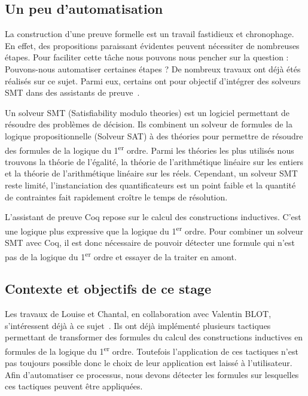 \documentclass[titlepage]{article}
\begin{document}
\subsection{Un peu d'automatisation}
La construction d'une preuve formelle est un travail fastidieux et chronophage. En effet, des propositions paraissant évidentes peuvent nécessiter de nombreuses étapes.
Pour faciliter cette tâche nous pouvons nous pencher sur la question : Pouvons-nous automatiser certaines étapes ? De nombreux travaux ont déjà étés réalisés sur ce sujet. Parmi eux, certains ont pour objectif d'intégrer des solveurs SMT dans des assistants de preuve~\cite{DBLP:conf/cpp/ArmandFGKTW11}.

Un solveur SMT (Satisfiability modulo theories) est un logiciel permettant de résoudre des problèmes de décision. Ils combinent un solveur de formules de la logique propositionnelle (Solveur SAT) à des théories pour permettre de résoudre des formules de la logique du 1\textsuperscript{er} ordre. Parmi les théories les plus utilisés nous trouvons la théorie de l'égalité, la théorie de l'arithmétique linéaire sur les entiers et la théorie de l'arithmétique linéaire sur les réels. Cependant, un solveur SMT reste limité, l'instanciation des quantificateurs est un point faible et la quantité de contraintes fait rapidement croître le temps de résolution.

L'assistant de preuve Coq repose sur le calcul des constructions inductives. C'est une logique plus expressive que la logique du 1\textsuperscript{er} ordre. Pour combiner un solveur SMT avec Coq, il est donc nécessaire de pouvoir détecter une formule qui n'est pas de la logique du 1\textsuperscript{er} ordre et essayer de la traiter en amont.


\subsection{Contexte et objectifs de ce stage}
Les travaux de Louise et Chantal, en collaboration avec Valentin BLOT, s'intéressent déjà à ce sujet~\cite{DBLP:journals/corr/abs-2107-02353,DBLP:journals/corr/abs-2204-02643,DBLP:conf/cpp/Blot0CPKMV23}. Ils ont déjà implémenté plusieurs tactiques permettant de transformer des formules du calcul des constructions inductives en formules de la logique du 1\textsuperscript{er} ordre. Toutefois l'application de ces tactiques n'est pas toujours possible donc le choix de leur application est laissé à l'utilisateur. Afin d'automatiser ce processus, nous devons détecter les formules sur lesquelles ces tactiques peuvent être appliquées.
\end{document}
